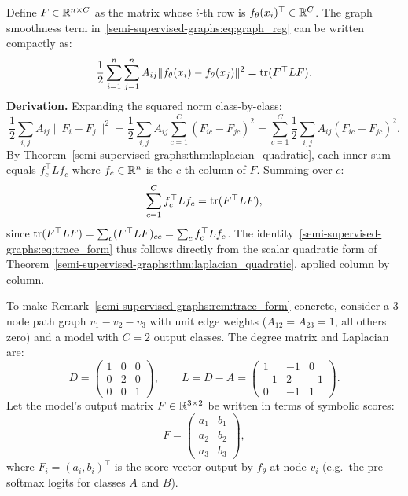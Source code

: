 \begin{notechapter}
\begin{remark}
\label{semi-supervised-graphs:rem:trace_form}
Define $F \in \mathbb{R}^{n \times C}$ as the matrix whose $i$-th row is
$f_\theta(x_i)^\top \in \mathbb{R}^C$. The graph smoothness term in~\eqref{semi-supervised-graphs:eq:graph_reg}
can be written compactly as:
\begin{equation}
\label{semi-supervised-graphs:eq:trace_form}
\frac{1}{2}\sum_{i=1}^n\sum_{j=1}^n A_{ij}\|f_\theta(x_i) - f_\theta(x_j)\|^2
= \operatorname{tr}(F^\top L F).
\end{equation}
\textbf{Derivation.} Expanding the squared norm class-by-class:
\[
\frac{1}{2}\sum_{i,j}A_{ij}\|F_i - F_j\|^2
= \frac{1}{2}\sum_{i,j}A_{ij}\sum_{c=1}^C(F_{ic}-F_{jc})^2
= \sum_{c=1}^C \frac{1}{2}\sum_{i,j}A_{ij}(F_{ic}-F_{jc})^2.
\]
By Theorem~\ref{semi-supervised-graphs:thm:laplacian_quadratic}, each inner sum equals $f_c^\top L f_c$
where $f_c \in \mathbb{R}^n$ is the $c$-th column of $F$. Summing over $c$:
\[
\sum_{c=1}^C f_c^\top L f_c = \operatorname{tr}(F^\top L F),
\]
since $\operatorname{tr}(F^\top L F) = \sum_c (F^\top L F)_{cc} = \sum_c f_c^\top L f_c$. The
identity~\eqref{semi-supervised-graphs:eq:trace_form} thus follows directly from the scalar quadratic
form of Theorem~\ref{semi-supervised-graphs:thm:laplacian_quadratic}, applied column by column.
\end{remark}

\begin{example}
\label{semi-supervised-graphs:ex:trace_form_symbolic}
To make Remark~\ref{semi-supervised-graphs:rem:trace_form} concrete, consider a 3-node path graph
$v_1 - v_2 - v_3$ with unit edge weights ($A_{12} = A_{23} = 1$, all others
zero) and a model with $C = 2$ output classes. The degree matrix and Laplacian
are:
\[
D = \begin{pmatrix} 1 & 0 & 0 \\ 0 & 2 & 0 \\ 0 & 0 & 1 \end{pmatrix}, \qquad
L = D - A = \begin{pmatrix} 1 & -1 & 0 \\ -1 & 2 & -1 \\ 0 & -1 & 1 \end{pmatrix}.
\]
Let the model's output matrix $F \in \mathbb{R}^{3 \times 2}$ be written in terms of
symbolic scores:
\[
F = \begin{pmatrix} a_1 & b_1 \\ a_2 & b_2 \\ a_3 & b_3 \end{pmatrix},
\]
where $F_i = (a_i, b_i)^\top$ is the score vector output by $f_\theta$ at node
$v_i$ (e.g.\ the pre-softmax logits for classes $A$ and $B$).


\end{example}
\end{notechapter}
